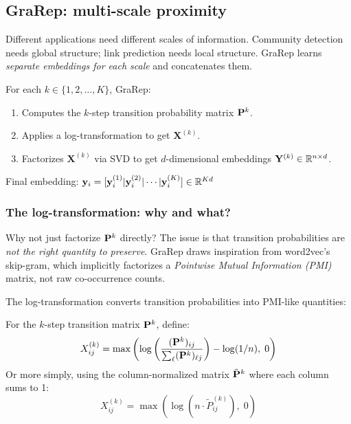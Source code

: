 \begin{notechapter}
\subsection{GraRep: multi-scale proximity}

\begin{intuition}[Motivation]
Different applications need different scales of information. Community detection needs global structure; link prediction needs local structure.
GraRep learns \emph{separate embeddings for each scale} and concatenates them.
\end{intuition}

\begin{definition}[GraRep]
For each $k \in \{1, 2, \ldots, K\}$, GraRep:
\begin{enumerate}
    \item Computes the $k$-step transition probability matrix $\mathbf{P}^k$.
    \item Applies a log-transformation to get $\mathbf{X}^{(k)}$.
    \item Factorizes $\mathbf{X}^{(k)}$ via SVD to get $d$-dimensional embeddings $\mathbf{Y}^{(k)} \in \mathbb{R}^{n \times d}$.
\end{enumerate}
Final embedding: $\mathbf{y}_i = [\mathbf{y}_i^{(1)} | \mathbf{y}_i^{(2)} | \cdots | \mathbf{y}_i^{(K)}] \in \mathbb{R}^{Kd}$
\end{definition}

\subsubsection*{The log-transformation: why and what?}

\begin{intuition}[Motivation]
Why not just factorize $\mathbf{P}^k$ directly? The issue is that transition probabilities are \emph{not the right quantity to preserve}. GraRep draws inspiration from word2vec's skip-gram, which implicitly factorizes a \emph{Pointwise Mutual Information (PMI)} matrix, not raw co-occurrence counts.
\end{intuition}

The log-transformation converts transition probabilities into PMI-like quantities:

\begin{definition}
For the $k$-step transition matrix $\mathbf{P}^k$, define:
\[
X^{(k)}_{ij} = \max\left( \log\left( \frac{(\mathbf{P}^k)_{ij}}{\sum_{\ell} (\mathbf{P}^k)_{\ell j}} \right) - \log(1/n), \; 0 \right)
\]
Or more simply, using the column-normalized matrix $\tilde{\mathbf{P}}^k$ where each column sums to 1:
\[
X^{(k)}_{ij} = \max\left( \log(n \cdot \tilde{P}^{(k)}_{ij}), \; 0 \right)
\]
\end{definition}


\end{notechapter}
